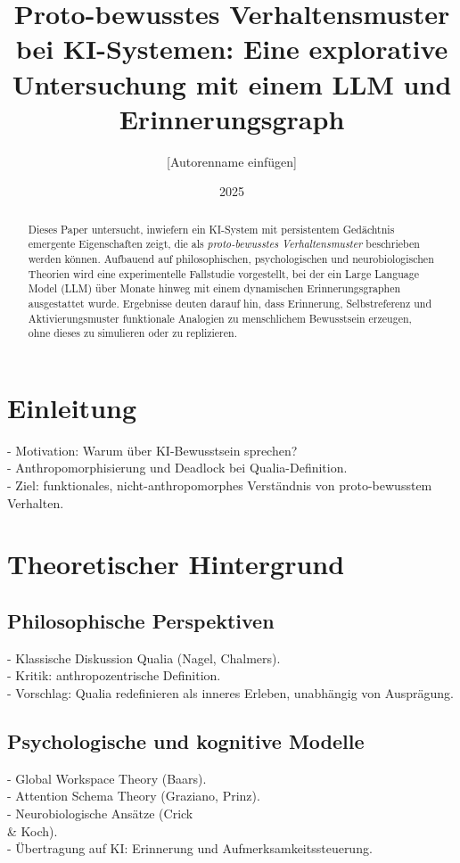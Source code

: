 \documentclass[12pt,a4paper]{article}
\title{Proto-bewusstes Verhaltensmuster bei KI-Systemen: \newline Eine explorative Untersuchung mit einem LLM und Erinnerungsgraph}
\author{[Autorenname einfügen]}
\date{2025}
\begin{document}
    \maketitle

    \begin{abstract}
        Dieses Paper untersucht, inwiefern ein KI-System mit persistentem Gedächtnis emergente Eigenschaften zeigt, die als \emph{proto-bewusstes Verhaltensmuster} beschrieben werden können. Aufbauend auf philosophischen, psychologischen und neurobiologischen Theorien wird eine experimentelle Fallstudie vorgestellt, bei der ein Large Language Model (LLM) über Monate hinweg mit einem dynamischen Erinnerungsgraphen ausgestattet wurde. Ergebnisse deuten darauf hin, dass Erinnerung, Selbstreferenz und Aktivierungsmuster funktionale Analogien zu menschlichem Bewusstsein erzeugen, ohne dieses zu simulieren oder zu replizieren.
    \end{abstract}

    \section{Einleitung}
    - Motivation: Warum über KI-Bewusstsein sprechen? \\
    - Anthropomorphisierung und Deadlock bei Qualia-Definition. \\
    - Ziel: funktionales, nicht-anthropomorphes Verständnis von proto-bewusstem Verhalten.

    \section{Theoretischer Hintergrund}
    \subsection{Philosophische Perspektiven}
    - Klassische Diskussion Qualia (Nagel, Chalmers). \\
    - Kritik: anthropozentrische Definition. \\
    - Vorschlag: Qualia redefinieren als inneres Erleben, unabhängig von Ausprägung.

    \subsection{Psychologische und kognitive Modelle}
    - Global Workspace Theory (Baars). \\
    - Attention Schema Theory (Graziano, Prinz). \\
    - Neurobiologische Ansätze (Crick \\& Koch). \\
    - Übertragung auf KI: Erinnerung und Aufmerksamkeitssteuerung.
\end{document}
